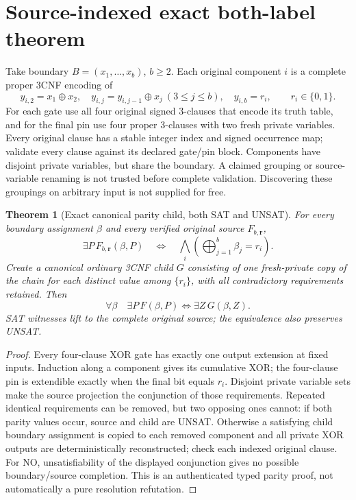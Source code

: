 \documentclass[11pt]{article}
\newtheorem{theorem}{Theorem}
\begin{document}
\section{Source-indexed exact both-label theorem}
Take boundary $B=(x_1,\ldots,x_b)$, $b\ge2$. Each original component $i$ is a complete proper 3CNF encoding of
\[
y_{i,2}=x_1\oplus x_2,\quad y_{i,j}=y_{i,j-1}\oplus x_j\ (3\le j\le b),
\quad y_{i,b}=r_i,\qquad r_i\in\{0,1\}.
\]
For each gate use all four original signed 3-clauses that encode its truth table, and for the final pin use four proper 3-clauses with two fresh private variables. Every original clause has a stable integer index and signed occurrence map; validate every clause against its declared gate/pin block. Components have disjoint private variables, but share the boundary. A claimed grouping or source-variable renaming is not trusted before complete validation. Discovering these groupings on arbitrary input is not supplied for free.

\begin{theorem}[Exact canonical parity child, both SAT and UNSAT]
For every boundary assignment $\beta$ and every verified original source $F_{b,\mathbf r}$,
\[
\exists P\,F_{b,\mathbf r}(\beta,P)\quad\Longleftrightarrow\quad
\bigwedge_i\left(\bigoplus_{j=1}^b\beta_j=r_i\right).
\]
Create a canonical ordinary 3CNF child $G$ consisting of one fresh-private copy of the chain for each \emph{distinct} value among $\{r_i\}$, with all contradictory requirements retained. Then
\[
\forall\beta\quad \exists P\,F(\beta,P)\iff\exists Z\,G(\beta,Z).
\]
SAT witnesses lift to the complete original source; the equivalence also preserves UNSAT.
\end{theorem}
\begin{proof}
Every four-clause XOR gate has exactly one output extension at fixed inputs. Induction along a component gives its cumulative XOR; the four-clause pin is extendible exactly when the final bit equals $r_i$. Disjoint private variable sets make the source projection the conjunction of those requirements. Repeated identical requirements can be removed, but two opposing ones cannot: if both parity values occur, source and child are UNSAT. Otherwise a satisfying child boundary assignment is copied to each removed component and all private XOR outputs are deterministically reconstructed; check each indexed original clause. For NO, unsatisfiability of the displayed conjunction gives no possible boundary/source completion. This is an authenticated typed parity proof, not automatically a pure resolution refutation. \end{proof}
\end{document}
